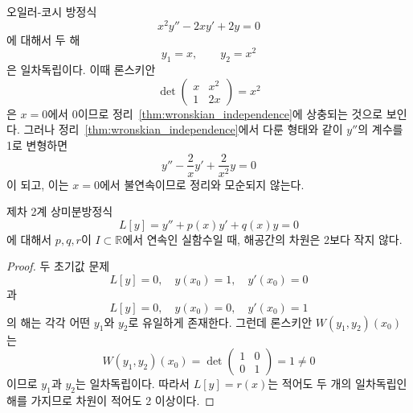 \documentclass[../engineering_mathematics_lecture_note.tex]{subfiles}
\begin{document}
\begin{remark}
    오일러-코시 방정식
    \begin{equation*}
        x^2 y'' - 2xy' + 2y = 0
    \end{equation*}
    에 대해서 두 해
    \begin{equation*}
        y_1 = x, \qquad y_2 =x^2
    \end{equation*}
    은 일차독립이다.
    이때 론스키안
    \begin{equation*}
        \det
        \begin{pmatrix}
            x & x^2\\
            1 & 2x
        \end{pmatrix}
        = x^2
    \end{equation*}
    은 $x = 0$에서 0이므로 정리~\ref{thm:wronskian_independence}에 상충되는 것으로 보인다.
    그러나 정리~\ref{thm:wronskian_independence}에서 다룬 형태와 같이 $y''$의 계수를 1로 변형하면
    \begin{equation*}
        y'' - \frac2x y' + \frac{2}{x^2} y = 0
    \end{equation*}
    이 되고, 이는 $x = 0$에서 불연속이므로 정리와 모순되지 않는다.
\end{remark}

\begin{theorem} \label{thm:2nd_order_sol_space_at_least_dim_2}
    제차 2계 상미분방정식
    \begin{equation*}
        L[y] = y'' + p(x) y' + q(x) y = 0
    \end{equation*}
    에 대해서
    $p, q, r$이 $I \subset \mathbb R$에서 연속인 실함수일 때, 해공간의 차원은 2보다 작지 않다.
\end{theorem}

\begin{proof}
    두 초기값 문제
    \begin{equation*}
        L[y] = 0, \quad y(x_0) = 1, \quad y'(x_0) = 0
    \end{equation*}
    과
    \begin{equation*}
        L[y] = 0, \quad y(x_0) = 0, \quad y'(x_0) = 1
    \end{equation*}
    의 해는 각각 어떤 $y_1$와 $y_2$로 유일하게 존재한다.
    그런데 론스키안 $W(y_1, y_2)(x_0)$는
    \begin{equation*}
        W(y_1, y_2)(x_0) = \det \begin{pmatrix}
            1 & 0\\
            0 & 1
        \end{pmatrix}
        = 1 \neq 0
    \end{equation*}
    이므로 $y_1$과 $y_2$는 일차독립이다.
    따라서 $L[y] = r(x)$는 적어도 두 개의 일차독립인 해를 가지므로 차원이 적어도 2 이상이다.
\end{proof}
\end{document}
